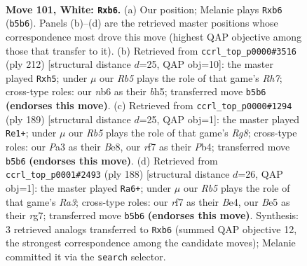 \documentclass[11pt]{article}
\begin{document}
\clearpage

\begin{figure}[p]\centering
\begin{subfigure}{0.46\textwidth}\centering
\resizebox{\linewidth}{!}{%
\newchessgame
\chessboard[
  setfen={6k1/5r2/1n5P/1R2B3/p7/P7/6K1/8 w - - 2 101},
  showmover=false,
  pgfstyle=straightmove, color=movearrow, markmove={b5-b6}
]}
\caption{}
\end{subfigure}\hfill
\begin{subfigure}{0.46\textwidth}\centering
\resizebox{\linewidth}{!}{%
\newchessgame
\chessboard[
  setfen={8/7R/3k4/2p4b/2P5/1r6/3K4/8 w - - 0 107},
  showmover=false,
  pgfstyle=straightmove, color=movearrow, markmove={h7-h5}
]}
\caption{}
\end{subfigure}
\\[4pt]
\begin{subfigure}{0.46\textwidth}\centering
\resizebox{\linewidth}{!}{%
\newchessgame
\chessboard[
  setfen={4b3/4k1p1/8/4K3/1p5P/3B4/1PR5/6r1 b - - 4 95},
  showmover=false,
  pgfstyle=straightmove, color=movearrow, markmove={g1-e1}
]}
\caption{}
\end{subfigure}\hfill
\begin{subfigure}{0.46\textwidth}\centering
\resizebox{\linewidth}{!}{%
\newchessgame
\chessboard[
  setfen={4b3/6r1/4k2p/8/4B2P/R7/4K3/8 w - - 0 95},
  showmover=false,
  pgfstyle=straightmove, color=movearrow, markmove={a3-a6}
]}
\caption{}
\end{subfigure}
\caption{\textbf{Move 101, White: \texttt{Rxb6}.} (a) Our position; Melanie plays \texttt{Rxb6} (\texttt{b5b6}). Panels (b)--(d) are the retrieved master positions whose correspondence most drove this move (highest QAP objective among those that transfer to it). (b) Retrieved from \texttt{ccrl\_top\_p0000\#3516} (ply 212) [structural distance $d$=25, QAP obj=10]: the master played \texttt{Rxh5}; under $\mu$ our \emph{Rb5} plays the role of that game's \emph{Rh7}; cross-type roles: our \emph{n}b6 as their \emph{b}h5; transferred move \texttt{b5b6} \textbf{(endorses this move)}. (c) Retrieved from \texttt{ccrl\_top\_p0000\#1294} (ply 189) [structural distance $d$=25, QAP obj=1]: the master played \texttt{Re1+}; under $\mu$ our \emph{Rb5} plays the role of that game's \emph{Rg8}; cross-type roles: our \emph{P}a3 as their \emph{B}e8, our \emph{r}f7 as their \emph{P}b4; transferred move \texttt{b5b6} \textbf{(endorses this move)}. (d) Retrieved from \texttt{ccrl\_top\_p0001\#2493} (ply 188) [structural distance $d$=26, QAP obj=1]: the master played \texttt{Ra6+}; under $\mu$ our \emph{Rb5} plays the role of that game's \emph{Ra3}; cross-type roles: our \emph{r}f7 as their \emph{B}e4, our \emph{B}e5 as their \emph{r}g7; transferred move \texttt{b5b6} \textbf{(endorses this move)}. Synthesis: 3 retrieved analogs transferred to \texttt{Rxb6} (summed QAP objective 12, the strongest correspondence among the candidate moves); Melanie committed it via the \texttt{search} selector.}
\label{fig:thought-m200}
\end{figure}
\end{document}
